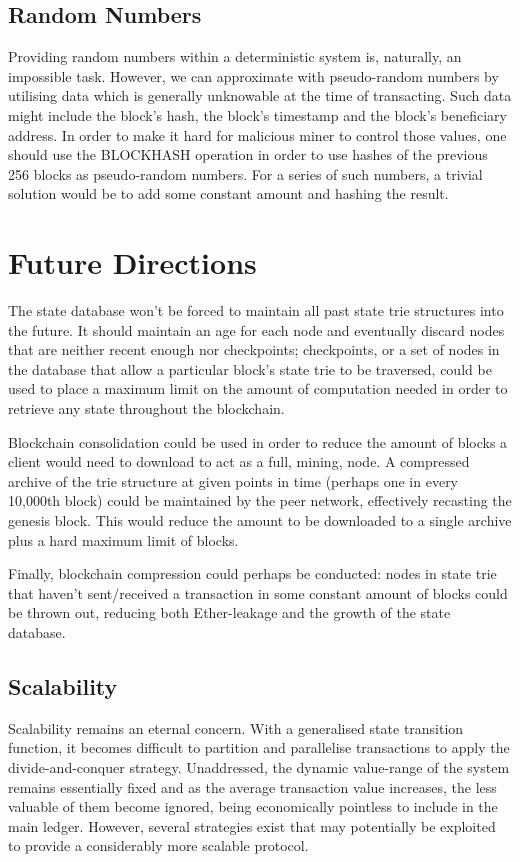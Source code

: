 \documentclass[9pt,oneside]{amsart}
\begin{document}
\begin{multicols}{2}
\subsection{Random Numbers}
Providing random numbers within a deterministic system is, naturally, an impossible task. However, we can approximate with pseudo-random numbers by utilising data which is generally unknowable at the time of transacting. Such data might include the block's hash, the block's timestamp and the block's beneficiary address. In order to make it hard for malicious miner to control those values, one should use the {\small BLOCKHASH} operation in order to use hashes of the previous 256 blocks as pseudo-random numbers. For a series of such numbers, a trivial solution would be to add some constant amount and hashing the result.

\section{Future Directions} \label{ch:future}

The state database won't be forced to maintain all past state trie structures into the future. It should maintain an age for each node and eventually discard nodes that are neither recent enough nor checkpoints; checkpoints, or a set of nodes in the database that allow a particular block's state trie to be traversed, could be used to place a maximum limit on the amount of computation needed in order to retrieve any state throughout the blockchain.

Blockchain consolidation could be used in order to reduce the amount of blocks a client would need to download to act as a full, mining, node. A compressed archive of the trie structure at given points in time (perhaps one in every 10,000th block) could be maintained by the peer network, effectively recasting the genesis block. This would reduce the amount to be downloaded to a single archive plus a hard maximum limit  of blocks.

Finally, blockchain compression could perhaps be conducted: nodes in state trie that haven't sent/received a transaction in some constant amount of blocks could be thrown out, reducing both Ether-leakage and the growth of the state database.

\subsection{Scalability}

Scalability remains an eternal concern. With a generalised state transition function, it becomes difficult to partition and parallelise transactions to apply the divide-and-conquer strategy. Unaddressed, the dynamic value-range of the system remains essentially fixed and as the average transaction value increases, the less valuable of them become ignored, being economically pointless to include in the main ledger. However, several strategies exist that may potentially be exploited to provide a considerably more scalable protocol.


\end{multicols}
\end{document}
